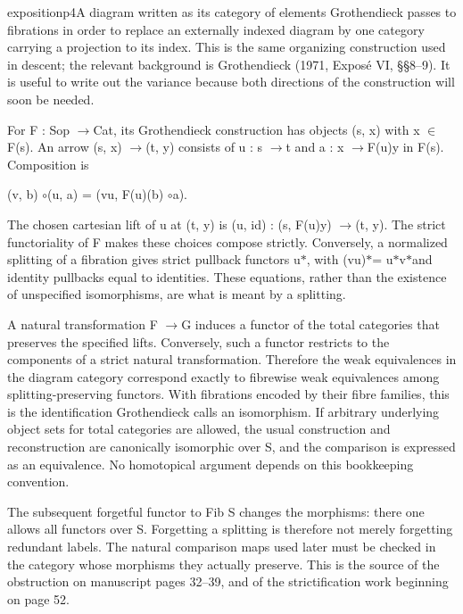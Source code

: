 \begin{dcomment}{exposition}{p4}{A diagram written as its category of elements}
Grothendieck passes to fibrations in order to replace an externally indexed diagram by one category carrying a projection to its index. This is the same organizing construction used in descent; the relevant background is Grothendieck (1971, Exposé VI, \S{}\S{}8--9). It is useful to write out the variance because both directions of the construction will soon be needed.

For F : Sop \ensuremath{\to}Cat, its Grothendieck construction has objects (s, x) with x \ensuremath{\in}F(s). An arrow (s, x) \ensuremath{\to}(t, y) consists of u : s \ensuremath{\to}t and a : x \ensuremath{\to}F(u)y in F(s). Composition is

(v, b) \ensuremath{\circ}(u, a) = (vu, F(u)(b) \ensuremath{\circ}a).

The chosen cartesian lift of u at (t, y) is (u, id) : (s, F(u)y) \ensuremath{\to}(t, y). The strict functoriality of F makes these choices compose strictly. Conversely, a normalized splitting of a fibration gives strict pullback functors u\ensuremath{*}, with (vu)\ensuremath{*}= u\ensuremath{*}v\ensuremath{*}and identity pullbacks equal to identities. These equations, rather than the existence of unspecified isomorphisms, are what is meant by a splitting.

A natural transformation F \ensuremath{\to}G induces a functor of the total categories that preserves the specified lifts. Conversely, such a functor restricts to the components of a strict natural transformation. Therefore the weak equivalences in the diagram category correspond exactly to fibrewise weak equivalences among splitting-preserving functors. With fibrations encoded by their fibre families, this is the identification Grothendieck calls an isomorphism. If arbitrary underlying object sets for total categories are allowed, the usual construction and reconstruction are canonically isomorphic over S, and the comparison is expressed as an equivalence. No homotopical argument depends on this bookkeeping convention.

The subsequent forgetful functor to Fib S changes the morphisms: there one allows all functors over S. Forgetting a splitting is therefore not merely forgetting redundant labels. The natural comparison maps used later must be checked in the category whose morphisms they actually preserve. This is the source of the obstruction on manuscript pages 32--39, and of the strictification work beginning on page 52.

\end{dcomment}

